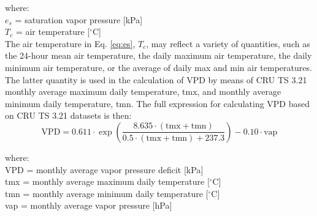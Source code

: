 \noindent where:\\
\indent $e_s$ = saturation vapor pressure [kPa]\\
\indent $T_c$ = air temperature [$^{\circ}$C]\\

\noindent The air temperature in Eq. \ref{eq:es}, $T_c$, may reflect a variety of quantities, such as the 24-hour mean air temperature, the daily maximum air temperature, the daily minimum air temperature, or the average of daily max and min air temperatures.  
The latter quantity is used in the calculation of VPD by means of CRU TS 3.21 monthly average maximum daily temperature, tmx, and monthly average minimum daily temperature, tmn.  
The full expression for calculating VPD based on CRU TS 3.21 datasets is then:
\begin{equation}
\label{eq:vpd}
    \text{VPD} = 0.611 \cdot \exp \left( \frac{8.635 \cdot \left( \text{tmx} + 
                 \text{tmn} \right)}{0.5 \cdot \left( \text{tmx} + 
                 \text{tmn} \right) + 237.3} \right) - 0.10 \cdot \text{vap}
\end{equation}

\noindent where:\\
\indent VPD = monthly average vapor pressure deficit [kPa]\\
\indent tmx = monthly average maximum daily temperature [$^{\circ}$C]\\
\indent tmn = monthly average minimum daily temperature [$^{\circ}$C]\\
\indent vap = monthly average vapor pressure [hPa]\\

